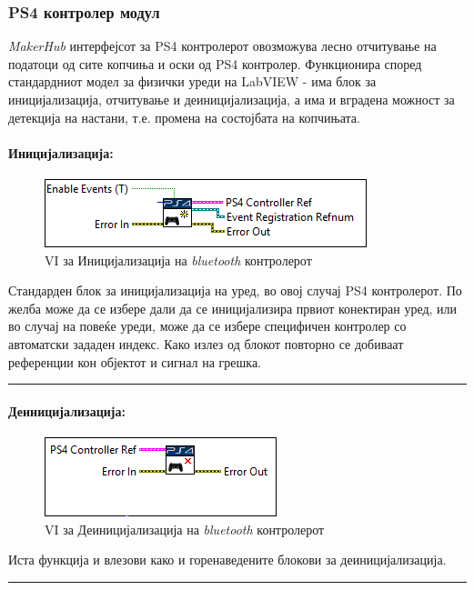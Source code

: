 \documentclass[11pt]{article}
\begin{document}
    \subsubsection{PS4 контролер модул}
      \textit{MakerHub} интерфејсот за PS4 контролерот овозможува лесно отчитување на податоци од сите копчиња и оски од PS4 контролер. Функционира според стандардниот модел за физички уреди на LabVIEW - има блок за иницијализација, отчитување и деиницијализација, а има и вградена можност за детекција на настани, т.е. промена на состојбата на копчињата.

      \paragraph{Иницијализација:\\}
	      \begin{figure}[H]
	        \includegraphics[width=0.55\linewidth]{./images/controller_init_border.png}
		      \caption{VI за Иницијализација на \textit{bluetooth} контролерот}
	        \label{fig:controller_init.png}
	        \raggedright
	        \end{figure}
        Стандарден блок за иницијализација на уред, во овој случај PS4 контролерот. По желба може да се избере дали да се иницијализира првиот конектиран уред, или во случај на повеќе уреди, може да се избере специфичен контролер со автоматски зададен индекс. Како излез од блокот повторно се добиваат референции кон објектот и сигнал на грешка.\\
        \textcolor[RGB]{150,150,150}{\rule{\linewidth}{1.6pt}}

      \paragraph{Деиницијализација:\\}
        \begin{figure}[H]
	        \includegraphics[width=0.55\linewidth]{./images/controller_deinit_border.png}
		      \caption{VI за Деиницијализација на \textit{bluetooth} контролерот}
	        \label{fig:controller_deinit.png}
	        \raggedright
	        \end{figure}
        Иста функција и влезови како и горенаведените блокови за деиницијализација.\\
        \textcolor[RGB]{150,150,150}{\rule{\linewidth}{1.6pt}}
\end{document}
